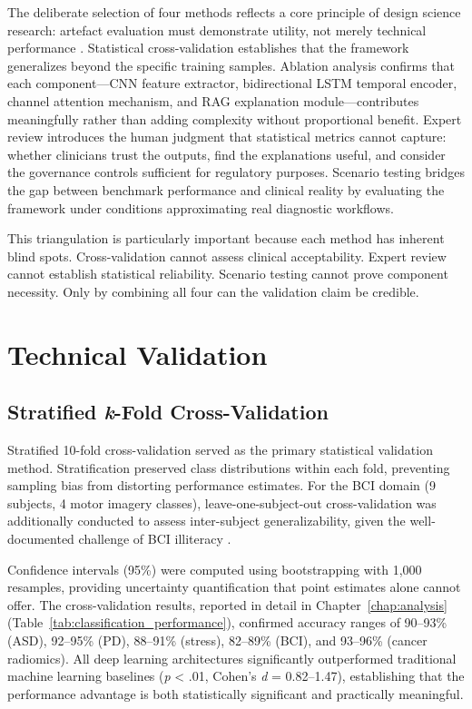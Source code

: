 The deliberate selection of four methods reflects a core principle of design science research: artefact evaluation must demonstrate utility, not merely technical performance \citep{hevner2004design}. Statistical cross-validation establishes that the framework generalizes beyond the specific training samples. Ablation analysis confirms that each component---CNN feature extractor, bidirectional LSTM temporal encoder, channel attention mechanism, and RAG explanation module---contributes meaningfully rather than adding complexity without proportional benefit. Expert review introduces the human judgment that statistical metrics cannot capture: whether clinicians trust the outputs, find the explanations useful, and consider the governance controls sufficient for regulatory purposes. Scenario testing bridges the gap between benchmark performance and clinical reality by evaluating the framework under conditions approximating real diagnostic workflows.

This triangulation is particularly important because each method has inherent blind spots. Cross-validation cannot assess clinical acceptability. Expert review cannot establish statistical reliability. Scenario testing cannot prove component necessity. Only by combining all four can the validation claim be credible.


\section{Technical Validation}
\label{sec:technical_validation}

\subsection{Stratified \textit{k}-Fold Cross-Validation}

Stratified 10-fold cross-validation \citep{kohavi1995crossvalidation} served as the primary statistical validation method. Stratification preserved class distributions within each fold, preventing sampling bias from distorting performance estimates. For the BCI domain (9 subjects, 4 motor imagery classes), leave-one-subject-out cross-validation was additionally conducted to assess inter-subject generalizability, given the well-documented challenge of BCI illiteracy \citep{allison2010bci}.

Confidence intervals (95\%) were computed using bootstrapping with 1,000 resamples, providing uncertainty quantification that point estimates alone cannot offer. The cross-validation results, reported in detail in Chapter~\ref{chap:analysis} (Table~\ref{tab:classification_performance}), confirmed accuracy ranges of 90--93\% (ASD), 92--95\% (PD), 88--91\% (stress), 82--89\% (BCI), and 93--96\% (cancer radiomics). All deep learning architectures significantly outperformed traditional machine learning baselines (\textit{p} < .01, Cohen's \textit{d} = 0.82--1.47), establishing that the performance advantage is both statistically significant and practically meaningful.

